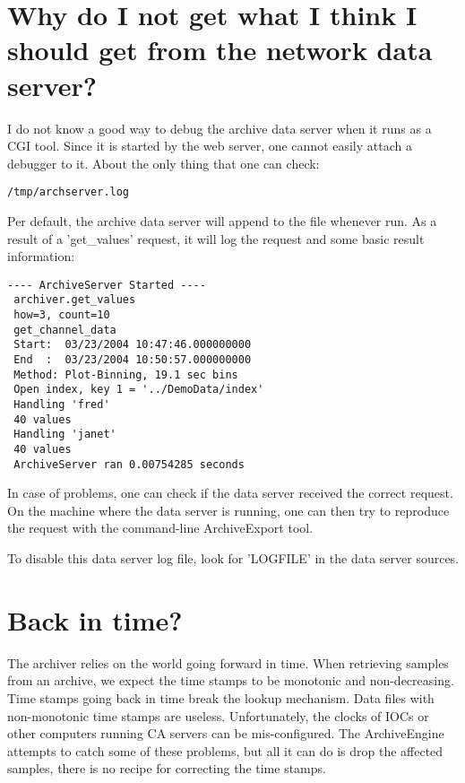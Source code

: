 \section{Why do I not get what I think I should get from the network data server?}
I do not know a good way to debug the archive data server when it runs
as a CGI tool. Since it is started by the web server, one cannot easily
attach a debugger to it.
About the only thing that one can check:
\begin{lstlisting}[keywordstyle=\sffamily]
   /tmp/archserver.log
\end{lstlisting}

Per default, the archive data server will append to the  file
whenever run. As a result of a 'get\_values' request, it will log
the request and some basic result information:

\begin{lstlisting}[keywordstyle=\sffamily]
 ---- ArchiveServer Started ----
 archiver.get_values
 how=3, count=10
 get_channel_data
 Start:  03/23/2004 10:47:46.000000000
 End  :  03/23/2004 10:50:57.000000000
 Method: Plot-Binning, 19.1 sec bins
 Open index, key 1 = '../DemoData/index'
 Handling 'fred'
 40 values
 Handling 'janet'
 40 values
 ArchiveServer ran 0.00754285 seconds
\end{lstlisting}

In case of problems, one can check if the data server received the
correct request. On the machine where the data server is running,
one can then try to reproduce the request with the command-line
ArchiveExport tool.

To disable this data server log file, look for 'LOGFILE' in the data server sources.

\section{Back in time?} \label{sec:back-in-timefaq} 
The archiver relies on the world going forward in time. When
retrieving samples from an archive, we expect the time stamps to be
monotonic and non-decreasing. Time stamps going back in time break the
lookup mechanism. Data files with non-monotonic time stamps are
useless. Unfortunately, the clocks of IOCs or other computers running
CA servers can be mis-configured. The ArchiveEngine attempts to catch
some of these problems, but all it can do is drop the affected
samples, there is no recipe for correcting the time stamps.

